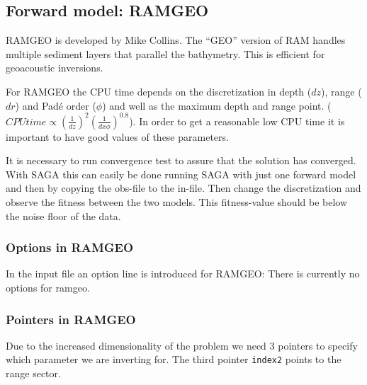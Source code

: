 \documentclass{saclantc}
\begin{document}
\subsection{Forward model: RAMGEO }
\label{se:ramgeo}

{\sf RAMGEO} \cite{colins:ram,colins:asa93}  is developed by Mike
Collins.
The ``GEO'' version  of RAM handles multiple sediment layers that 
     parallel the bathymetry. This is efficient for geoacoustic inversions.


For {\sf RAMGEO} the CPU time depends on the discretization in depth
($dz$), range ($dr$) and Pad\'{e} order ($\phi$) and well as the maximum
depth and range point. ($CPUtime \propto (\frac{1}{dz})^2 (\frac{1}{dx
\phi})^{0.8}$). In order to get a reasonable low CPU time it is important to
have good values of these parameters.

It is necessary to run convergence test to assure that the solution
has converged. With {\sf SAGA } this can
easily be done running {\sf SAGA } with just one forward model and then
by copying the obs-file to the in-file. Then change the
discretization and observe the  fitness between the two models.
This fitness-value should be below the noise floor of the data.


\subsubsection{Options in RAMGEO}
In the input file an option line is introduced for {\sf RAMGEO}:
There is currently no options for ramgeo.


\subsubsection{Pointers in RAMGEO}
\label{se:ramgeopoint}
Due to the increased dimensionality of the problem we need 3 pointers to specify
which parameter we are inverting for. The third pointer {\tt index2} points to the range sector.
\end{document}
